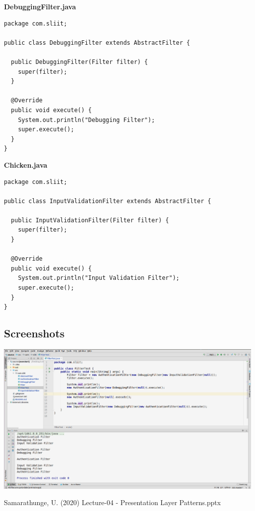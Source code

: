 \documentclass[12pt]{scrartcl} %
\begin{document}
\textbf{DebuggingFilter.java}
\lstset{language=Java}
\begin{lstlisting}[frame=single]
package com.sliit;

public class DebuggingFilter extends AbstractFilter {

  public DebuggingFilter(Filter filter) {
    super(filter);
  }

  @Override
  public void execute() {
    System.out.println("Debugging Filter");
    super.execute();
  }
}
\end{lstlisting}


\textbf{Chicken.java}
\lstset{language=Java}
\begin{lstlisting}[frame=single]
package com.sliit;

public class InputValidationFilter extends AbstractFilter {

  public InputValidationFilter(Filter filter) {
    super(filter);
  }

  @Override
  public void execute() {
    System.out.println("Input Validation Filter");
    super.execute();
  }
}
\end{lstlisting}

\subsection*{Screenshots}
\begin{center}
	\includegraphics[width=1.0\columnwidth]{./figures/01.png}
	\label{Solution}%
\end{center}


\pagebreak
\newpage
\begin{thebibliography}{00}
	\raggedright
     Samarathunge, U. (2020) Lecture-04 - Presentation Layer Patterns.pptx
\end{thebibliography}
\end{document}
